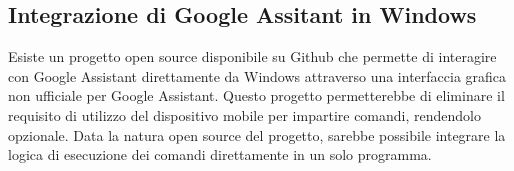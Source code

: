 \subsection{Integrazione di Google Assitant in Windows}
Esiste un progetto open source disponibile su Github che permette di interagire con Google Assistant direttamente da Windows attraverso una interfaccia grafica non ufficiale per Google Assistant.
Questo progetto permetterebbe di eliminare il requisito di utilizzo del dispositivo mobile per impartire comandi, rendendolo opzionale. 
Data la natura open source del progetto, sarebbe possibile integrare la logica di esecuzione dei comandi direttamente in un solo programma.